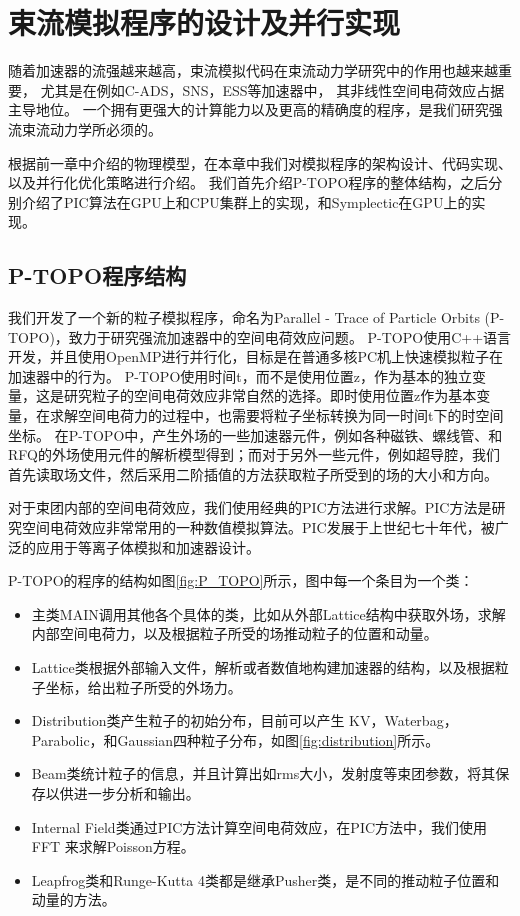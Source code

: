 
\chapter{束流模拟程序的设计及并行实现}
\label{chap:Code}
随着加速器的流强越来越高，束流模拟代码在束流动力学研究中的作用也越来越重要，
尤其是在例如C-ADS，SNS，ESS等加速器中\cite{li2013ADS,henderson2014SNS,eshraqi2016ess}，
其非线性空间电荷效应占据主导地位。
一个拥有更强大的计算能力以及更高的精确度的程序，是我们研究强流束流动力学所必须的。

根据前一章中介绍的物理模型，在本章中我们对模拟程序的架构设计、代码实现、以及并行化优化策略进行介绍。
我们首先介绍P-TOPO程序的整体结构，之后分别介绍了PIC算法在GPU上和CPU集群上的实现，和Symplectic在GPU上的实现。

\section{P-TOPO程序结构}
我们开发了一个新的粒子模拟程序，命名为Parallel - Trace of Particle Orbits (P-TOPO)，致力于研究强流加速器中的空间电荷效应问题\cite{li2016nonlinear,li2014envelope,li16collective,li2015space}。
P-TOPO使用C++语言开发，并且使用OpenMP进行并行化，目标是在普通多核PC机上快速模拟粒子在加速器中的行为。
P-TOPO使用时间t，而不是使用位置z，作为基本的独立变量，这是研究粒子的空间电荷效应非常自然的选择。即时使用位置z作为基本变量，在求解空间电荷力的过程中，也需要将粒子坐标转换为同一时间t下的时空间坐标。
在P-TOPO中，产生外场的一些加速器元件，例如各种磁铁、螺线管、和RFQ的外场使用元件的解析模型得到；而对于另外一些元件，例如超导腔，我们首先读取场文件\cite{studio2008cst}，然后采用二阶插值的方法获取粒子所受到的场的大小和方向。

对于束团内部的空间电荷效应，我们使用经典的PIC方法进行求解\cite{hockney1988computer}。PIC方法是研究空间电荷效应非常常用的一种数值模拟算法\cite{PIC_birdsall2004plasma,PIC_luccio2002space}。PIC发展于上世纪七十年代，被广泛的应用于等离子体模拟和加速器设计。

P-TOPO的程序的结构如图\ref{fig:P_TOPO}所示，图中每一个条目为一个类：
\begin{itemize}
  \item 主类MAIN调用其他各个具体的类，比如从外部Lattice结构中获取外场，求解内部空间电荷力，以及根据粒子所受的场推动粒子的位置和动量。
  \item Lattice类根据外部输入文件，解析或者数值地构建加速器的结构，以及根据粒子坐标，给出粒子所受的外场力。
  \item Distribution类产生粒子的初始分布，目前可以产生 KV，Waterbag，Parabolic，和Gaussian四种粒子分布，如图\ref{fig:distribution}所示。
  \item Beam类统计粒子的信息，并且计算出如rms大小，发射度等束团参数，将其保存以供进一步分析和输出。
  \item Internal Field类通过PIC方法计算空间电荷效应，在PIC方法中，我们使用FFT 来求解Poisson方程。
  \item Leapfrog类和Runge-Kutta 4类都是继承Pusher类，是不同的推动粒子位置和动量的方法。
\end{itemize}

